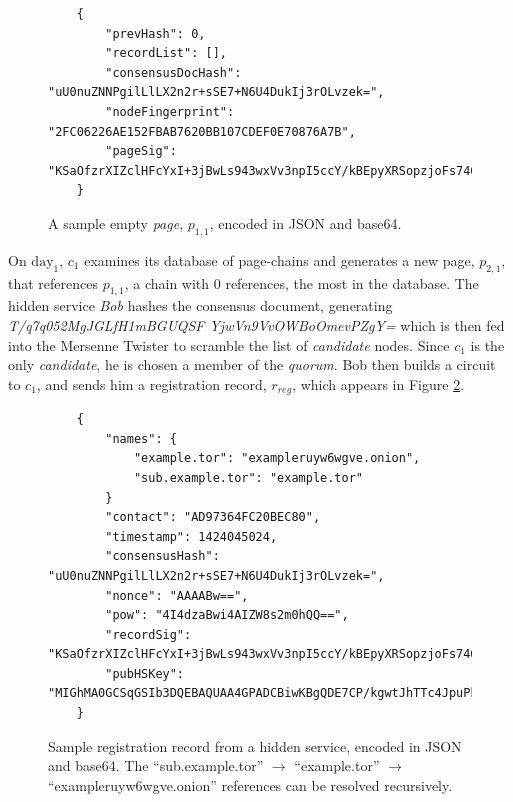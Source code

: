 \begin{figure}
	\begin{lstlisting}
	{
		"prevHash": 0,
		"recordList": [],
		"consensusDocHash": "uU0nuZNNPgilLlLX2n2r+sSE7+N6U4DukIj3rOLvzek=",
		"nodeFingerprint": "2FC06226AE152FBAB7620BB107CDEF0E70876A7B",
		"pageSig": "KSaOfzrXIZclHFcYxI+3jBwLs943wxVv3npI5ccY/kBEpyXRSopzjoFs746n0tJqUpdY4Kbe6DBwERaN7ELmSSK9Pu6q8QeKzNAh+QOnKl0fKBN7fqowjkQ3ktFkR0Vuox9WrrbNTMa4+up0Np52hlbKA3zSRz4fbR9NVlh6uuQ="
	}
	\end{lstlisting}
	\caption{A sample empty \emph{page}, $ p_{1,1} $, encoded in JSON and base64.}
	\label{fig:emptyPage}
\end{figure}

On $ \textrm{day}_{1} $, $ c_{1} $ examines its database of page-chains and generates a new page, $ p_{2,1} $, that references $ p_{1,1} $, a chain with 0 references, the most in the database. The hidden service \emph{Bob} hashes the consensus document, generating \emph{T/q7q052MgJGLfH1mBGUQSF YjwVn9VvOWBoOmevPZgY=} which is then fed into the Mersenne Twister to scramble the list of \emph{candidate} nodes. Since $ c_{1} $ is the only \emph{candidate}, he is chosen a member of the \emph{quorum}. Bob then builds a circuit to $ c_{1} $, and sends him a registration record, $ r_{reg} $, which appears in Figure \ref{fig:sampleRecord}. 

\begin{figure}
	\begin{lstlisting}
	{
		"names": {
			"example.tor": "exampleruyw6wgve.onion",
			"sub.example.tor": "example.tor"
		}
		"contact": "AD97364FC20BEC80",
		"timestamp": 1424045024,
		"consensusHash": "uU0nuZNNPgilLlLX2n2r+sSE7+N6U4DukIj3rOLvzek=",
		"nonce": "AAAABw==",
		"pow": "4I4dzaBwi4AIZW8s2m0hQQ==",
		"recordSig": 	"KSaOfzrXIZclHFcYxI+3jBwLs943wxVv3npI5ccY/kBEpyXRSopzjoFs746n0tJqUpdY4Kbe6DBwERaN7ELmSSK9Pu6q8QeKzNAh+QOnKl0fKBN7fqowjkQ3ktFkR0Vuox9WrrbNTMa4+up0Np52hlbKA3zSRz4fbR9NVlh6uuQ=",
		"pubHSKey": "MIGhMA0GCSqGSIb3DQEBAQUAA4GPADCBiwKBgQDE7CP/kgwtJhTTc4JpuPkvA7Ln9wgc+fgTKgkyUp1zusxgUAn1c1MGx4YhO42KPB7dyZOf3pcRk94XsYFY1ULkF2+tf9KdNe7GFzJyMFCQENnUcVXbcwLH4vAeiGK7R/nScbCbyc9LT+VE1fbKchTL1QzLVBLqJTxhR+9YPi8x+QIFAdZ8BJs="
	}
	\end{lstlisting}
	\caption{Sample registration record from a hidden service, encoded in JSON and base64. The ``sub.example.tor'' $ \to $ ``example.tor'' $ \to $ ``exampleruyw6wgve.onion'' references can be resolved recursively.}
	\label{fig:sampleRecord}
\end{figure}

